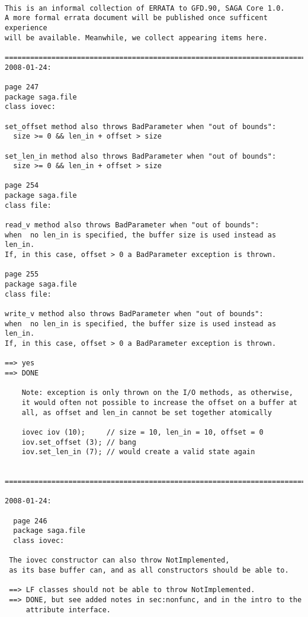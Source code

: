 \documentclass{article}
\begin{document}
\begin{verbatim}

This is an informal collection of ERRATA to GFD.90, SAGA Core 1.0.
A more formal errata document will be published once sufficent experience
will be available. Meanwhile, we collect appearing items here.

=========================================================================
2008-01-24:

page 247
package saga.file
class iovec:

set_offset method also throws BadParameter when "out of bounds":
  size >= 0 && len_in + offset > size

set_len_in method also throws BadParameter when "out of bounds":
  size >= 0 && len_in + offset > size

page 254
package saga.file
class file:

read_v method also throws BadParameter when "out of bounds":
when  no len_in is specified, the buffer size is used instead as len_in.
If, in this case, offset > 0 a BadParameter exception is thrown.

page 255
package saga.file
class file:

write_v method also throws BadParameter when "out of bounds":
when  no len_in is specified, the buffer size is used instead as len_in.
If, in this case, offset > 0 a BadParameter exception is thrown.

==> yes
==> DONE

    Note: exception is only thrown on the I/O methods, as otherwise,
    it would often not possible to increase the offset on a buffer at
    all, as offset and len_in cannot be set together atomically

    iovec iov (10);     // size = 10, len_in = 10, offset = 0 
    iov.set_offset (3); // bang
    iov.set_len_in (7); // would create a valid state again
    

=========================================================================

2008-01-24:

  page 246
  package saga.file
  class iovec:

 The iovec constructor can also throw NotImplemented,
 as its base buffer can, and as all constructors should be able to.

 ==> LF classes should not be able to throw NotImplemented.
 ==> DONE, but see added notes in sec:nonfunc, and in the intro to the
     attribute interface.


\end{verbatim}
\end{document}

